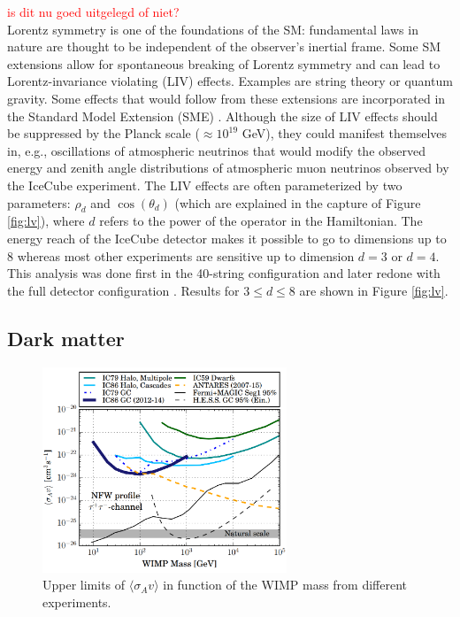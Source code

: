 \textcolor{red}{is dit  nu goed uitgelegd of niet?\\}
Lorentz symmetry is one of the foundations of the SM: fundamental laws in nature are thought to be independent of the observer's inertial frame. Some SM extensions allow for spontaneous breaking of Lorentz symmetry and can lead to Lorentz-invariance violating (LIV) effects. Examples are string theory or quantum gravity. Some effects that would follow from these extensions are incorporated in the Standard Model Extension (SME) \cite{Colladay:1998fq}. Although the size of LIV effects should be suppressed by the Planck scale ($\approx 10^{19}$ GeV), they could manifest themselves in, e.g., oscillations of atmospheric neutrinos that would modify the observed energy and zenith angle distributions of atmospheric muon neutrinos observed by the IceCube experiment. The LIV effects are often parameterized by two parameters: $\rho_d$ and $\cos \left(\theta_d\right)$ (which are explained in the capture of Figure \ref{fig:lv}), where $d$ refers to the power of the operator in the Hamiltonian. The energy reach of the IceCube detector makes it possible to go to dimensions up to 8 whereas most other experiments are sensitive up to dimension $d=3$ or $d=4$. This analysis was done first in the 40-string configuration \cite{Abbasi:2010kx} and later redone with the full detector configuration \cite{Aartsen:2017ibm}. Results for $3 \leq d \leq 8$ are shown in Figure \ref{fig:lv}.

\subsection{Dark matter}
\label{subsubsec:DM}

\begin{figure}[ht]
\centering
\includegraphics[width=0.65\textwidth]{chapter5/img/dm.png}
\caption{Upper limits of $\langle \sigma_A v\rangle$ in function of the WIMP mass from different experiments.}
\label{fig:dm}
\end{figure}


